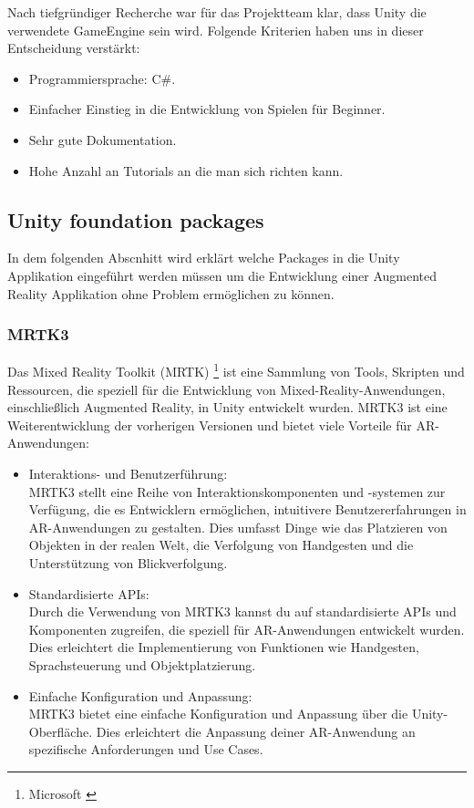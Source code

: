 Nach tiefgründiger Recherche war für das Projektteam klar, dass Unity die verwendete GameEngine sein wird.
Folgende Kriterien haben uns in dieser Entscheidung verstärkt:
\begin{itemize}
    \item Programmiersprache: C#.
    \item Einfacher Einstieg in die Entwicklung von Spielen für Beginner.
    \item Sehr gute Dokumentation.
    \item Hohe Anzahl an Tutorials an die man sich richten kann.
\end{itemize}

\subsection{Unity foundation packages}
In dem folgenden Abscnhitt wird erklärt welche Packages in die Unity Applikation
eingeführt werden müssen um die Entwicklung einer Augmented Reality Applikation ohne Problem
ermöglichen zu können.

\subsubsection{MRTK3}
Das Mixed Reality Toolkit (MRTK) \footnote{Microsoft \cite{MRTK3}} ist eine Sammlung von Tools,
Skripten und Ressourcen, die speziell für die Entwicklung von Mixed-Reality-Anwendungen, einschließlich Augmented
Reality, in Unity entwickelt wurden. MRTK3 ist eine Weiterentwicklung der vorherigen Versionen und bietet viele
Vorteile für AR-Anwendungen:
\begin{itemize}
    \item Interaktions- und Benutzerführung: \\
    MRTK3 stellt eine Reihe von Interaktionskomponenten und -systemen zur
    Verfügung, die es Entwicklern ermöglichen, intuitivere Benutzererfahrungen in AR-Anwendungen zu gestalten.
    Dies umfasst Dinge wie das Platzieren von Objekten in der realen Welt, die Verfolgung von Handgesten und die
    Unterstützung von Blickverfolgung.
    \item Standardisierte APIs: \\
    Durch die Verwendung von MRTK3 kannst du auf standardisierte APIs und Komponenten
    zugreifen, die speziell für AR-Anwendungen entwickelt wurden. Dies erleichtert die Implementierung von Funktionen
    wie Handgesten, Sprachsteuerung und Objektplatzierung.
    \item Einfache Konfiguration und Anpassung: \\
    MRTK3 bietet eine einfache Konfiguration und Anpassung über die
    Unity-Oberfläche. Dies erleichtert die Anpassung deiner AR-Anwendung an spezifische Anforderungen und Use Cases.
\end{itemize}

